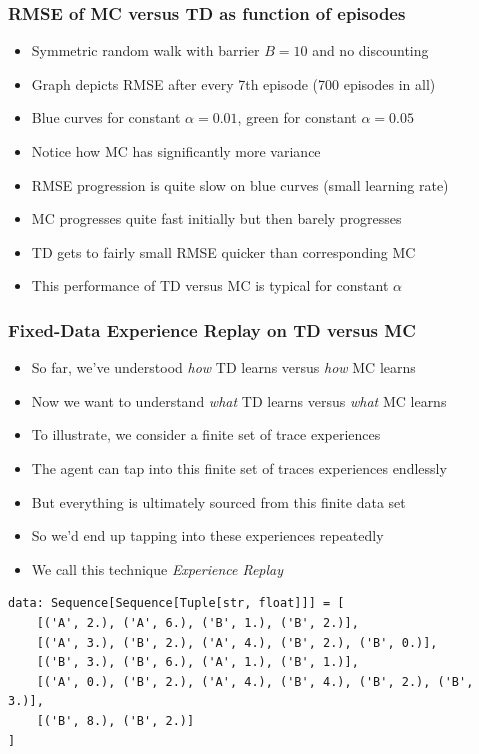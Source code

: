 \documentclass[handout]{beamer}
\begin{document}
\begin{frame}
\frametitle{RMSE of MC versus TD as function of episodes}
\pause
\begin{itemize}[<+->]
\item Symmetric random walk with barrier $B=10$ and no discounting
\item Graph depicts RMSE after every 7th episode (700 episodes in all)
\item Blue curves for constant $\alpha = 0.01$, green for constant $\alpha = 0.05$
\item Notice how MC has significantly more variance
\item RMSE progression is quite slow on blue curves (small learning rate)
\item MC progresses quite fast initially but then barely progresses
\item TD gets to fairly small RMSE quicker than corresponding MC
\item This performance of TD versus MC is typical for constant $\alpha$
\end{itemize}
\end{frame}

\begin{frame}[fragile]
\frametitle{Fixed-Data Experience Replay on TD versus MC}
\pause
\begin{itemize}[<+->]
\item So far, we've understood {\em how} TD learns versus {\em how} MC learns
\item Now we want to understand {\em what} TD learns versus {\em what} MC learns
\item To illustrate, we consider a finite set of trace experiences
\item The agent can tap into this finite set of traces experiences endlessly
\item But everything is ultimately sourced from this finite data set
\item So we'd end up tapping into these experiences repeatedly
\item We call this technique {\em Experience Replay}
\end{itemize}
\pause
\begin{lstlisting}
data: Sequence[Sequence[Tuple[str, float]]] = [
    [('A', 2.), ('A', 6.), ('B', 1.), ('B', 2.)],
    [('A', 3.), ('B', 2.), ('A', 4.), ('B', 2.), ('B', 0.)],
    [('B', 3.), ('B', 6.), ('A', 1.), ('B', 1.)],
    [('A', 0.), ('B', 2.), ('A', 4.), ('B', 4.), ('B', 2.), ('B', 3.)],
    [('B', 8.), ('B', 2.)]
]
\end{lstlisting}
\end{frame}
\end{document}

